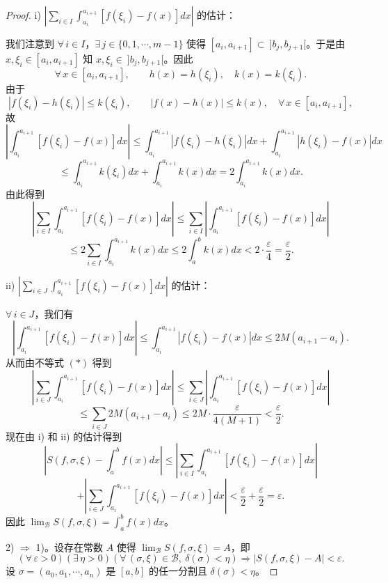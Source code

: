 \begin{proof}
	i) \(\left|\sum_{i\in I}\int_{a_i}^{a_{i+1}}[f(\xi_i)-f(x)]dx\right|\) 的估计：

	我们注意到 \(\forall\,i\in I\)，\(\exists\,j\in\{0,1,\cdots,m-1\}\) 使得 \([a_i,a_{i+1}]\subset\ ]b_j,b_{j+1}[\)。于是由 \(x,\xi_i\in[a_i,a_{i+1}]\) 知 \(x,\xi_i\in\ ]b_j,b_{j+1}[\)。因此
	\[
	\forall\,x\in[a_i,a_{i+1}],\qquad h(x)=h(\xi_i),\quad k(x)=k(\xi_i).
	\]
	由于
	\[
	|f(\xi_i)-h(\xi_i)|\le k(\xi_i),\qquad |f(x)-h(x)|\le k(x),\quad\forall\,x\in[a_i,a_{i+1}],
	\]
	故
	\[
	\left|\int_{a_i}^{a_{i+1}}[f(\xi_i)-f(x)]dx\right|
	\le\int_{a_i}^{a_{i+1}}|f(\xi_i)-h(\xi_i)|dx+\int_{a_i}^{a_{i+1}}|h(\xi_i)-f(x)|dx
	\]
	\[
	\le\int_{a_i}^{a_{i+1}}k(\xi_i)dx+\int_{a_i}^{a_{i+1}}k(x)dx=2\int_{a_i}^{a_{i+1}}k(x)dx.
	\]
	由此得到
	\[
	\left|\sum_{i\in I}\int_{a_i}^{a_{i+1}}[f(\xi_i)-f(x)]dx\right|
	\le\sum_{i\in I}\left|\int_{a_i}^{a_{i+1}}[f(\xi_i)-f(x)]dx\right|
	\]
	\[
	\le2\sum_{i\in I}\int_{a_i}^{a_{i+1}}k(x)dx\le2\int_a^b k(x)dx<2\cdot\frac{\varepsilon}{4}=\frac{\varepsilon}{2}.
	\]

	ii) \(\left|\sum_{i\in J}\int_{a_i}^{a_{i+1}}[f(\xi_i)-f(x)]dx\right|\) 的估计：

	\(\forall\,i\in J\)，我们有
	\[
	\left|\int_{a_i}^{a_{i+1}}[f(\xi_i)-f(x)]dx\right|
	\le\int_{a_i}^{a_{i+1}}|f(\xi_i)-f(x)|dx\le2M(a_{i+1}-a_i).
	\]
	从而由不等式 \((*)\) 得到
	\[
	\left|\sum_{i\in J}\int_{a_i}^{a_{i+1}}[f(\xi_i)-f(x)]dx\right|
	\le\sum_{i\in J}\left|\int_{a_i}^{a_{i+1}}[f(\xi_i)-f(x)]dx\right|
	\]
	\[
	\le\sum_{i\in J}2M(a_{i+1}-a_i)\le2M\cdot\frac{\varepsilon}{4(M+1)}<\frac{\varepsilon}{2}.
	\]
	现在由 i) 和 ii) 的估计得到
	\[
	\left|S(f,\sigma,\xi)-\int_a^b f(x)dx\right|
	\le\left|\sum_{i\in I}\int_{a_i}^{a_{i+1}}[f(\xi_i)-f(x)]dx\right|
	\]
	\[
	+\left|\sum_{i\in J}\int_{a_i}^{a_{i+1}}[f(\xi_i)-f(x)]dx\right|<\frac{\varepsilon}{2}+\frac{\varepsilon}{2}=\varepsilon.
	\]
	因此 \(\displaystyle\lim_{\mathscr{B}}S(f,\sigma,\xi)=\int_a^b f(x)dx\)。

	2) \(\Longrightarrow\) 1)。设存在常数 \(A\) 使得 \(\displaystyle\lim_{\mathscr{B}}S(f,\sigma,\xi)=A\)，即
	\[
	(\forall\,\varepsilon>0)(\exists\,\eta>0)(\forall\,(\sigma,\xi)\in\mathscr{B},\ \delta(\sigma)<\eta)\Longrightarrow|S(f,\sigma,\xi)-A|<\varepsilon.
	\]
	设 \(\sigma=(a_0,a_1,\cdots,a_n)\) 是 \([a,b]\) 的任一分割且 \(\delta(\sigma)<\eta\)。


\end{proof}
